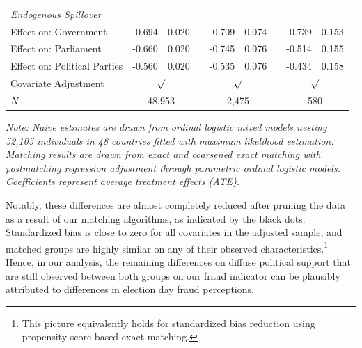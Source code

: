\documentclass[11pt, ngerman,english,a4]{article}
\begin{document}
\begin{table}[]
\begin{tabular}{llllccccc}
		\textit{Endogenous Spillover} &                                    &                                       &                               &                      &                      &                      &                      &                      \\
		Effect on: Government         & -0.694                             & 0.020                                 &                               & -0.709               & 0.074                &                      & -0.739               & 0.153                \\
		Effect on: Parliament         & -0.660                             & 0.020                                 &                               & -0.745               & 0.076                &                      & -0.514               & 0.155                \\
		Effect on: Political Parties  & -0.560                             & 0.020                                 &                               & -0.535               & 0.076                &                      & -0.434               & 0.158                \\ \hline
		Covariate Adjustment          & \multicolumn{2}{c}{$\surd$}                                                & \multicolumn{1}{c}{}          & \multicolumn{2}{c}{$\surd$}                  &                      & \multicolumn{2}{c}{$\surd$}                 \\
		$N$                             & \multicolumn{2}{c}{48,953}                                                 & \multicolumn{1}{c}{}          & \multicolumn{2}{c}{2,475}                    &                      & \multicolumn{2}{c}{580}                     \\ \hline
	\end{tabular}
	\textit{Note: Na{\"i}ve estimates are drawn from ordinal logistic mixed models nesting 52,105 individuals in 48 countries fitted with maximum likelihood estimation. Matching results are drawn from exact and coarsened exact matching with postmatching regression adjustment through parametric ordinal logistic models. Coefficients represent average treatment effects (ATE).}
\end{table}

Notably, these differences are almost completely reduced after pruning the data as a result of our matching algorithms, as indicated by the black dots. Standardized bias is close to zero for all covariates in the adjusted sample, and matched groups are highly similar on any of their observed characteristics.\footnote{This picture equivalently holds for standardized bias reduction using propensity-score based exact matching.} Hence, in our analysis, the remaining differences on diffuse political support that are still observed between both groups on our fraud indicator can be plausibly attributed to differences in election day fraud perceptions. 
\end{document}
